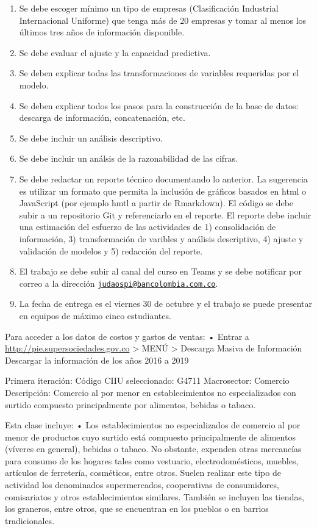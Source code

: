 \documentclass[
  11pt,
]{article}
\begin{document}
\begin{enumerate}
\def\labelenumi{\arabic{enumi}.}
\setcounter{enumi}{1}
\item
  Se debe escoger mínimo un tipo de empresas (Clasificación Industrial
  Internacional Uniforme) que tenga más de 20 empresas y tomar al menos
  los últimos tres años de información disponible.
\item
  Se debe evaluar el ajuste y la capacidad predictiva.
\item
  Se deben explicar todas las transformaciones de variables requeridas
  por el modelo.
\item
  Se deben explicar todos los pasos para la construcción de la base de
  datos: descarga de información, concatenación, etc.
\item
  Se debe incluir un análisis descriptivo.
\item
  Se debe incluir un análsis de la razonabilidad de las cifras.
\item
  Se debe redactar un reporte técnico documentando lo anterior. La
  sugerencia es utilizar un formato que permita la inclusión de gráficos
  basados en html o JavaScript (por ejemplo hmtl a partir de Rmarkdown).
  El código se debe subir a un repositorio Git y referenciarlo en el
  reporte. El reporte debe incluir una estimación del esfuerzo de las
  actividades de 1) consolidación de información, 3) transformación de
  varibles y análisis descriptivo, 4) ajuste y validación de modelos y
  5) redacción del reporte.
\item
  El trabajo se debe subir al canal del curso en Teams y se debe
  notificar por correo a la dirección
  \href{mailto:judaospi@bancolombia.com.co}{\nolinkurl{judaospi@bancolombia.com.co}}.
\item
  La fecha de entrega es el viernes 30 de octubre y el trabajo se puede
  presentar en equipos de máximo cinco estudiantes.
\end{enumerate}

Para acceder a los datos de costos y gastos de ventas: • Entrar a
\url{http://pie.supersociedades.gov.co} \textgreater{} MENÚ
\textgreater{} Descarga Masiva de Información Descargar la información
de los años 2016 a 2019

Primera iteración: Código CIIU seleccionado: G4711 Macrosector: Comercio
Descripción: Comercio al por menor en establecimientos no especializados
con surtido compuesto principalmente por alimentos, bebidas o tabaco.

Esta clase incluye: • Los establecimientos no especializados de comercio
al por menor de productos cuyo surtido está compuesto principalmente de
alimentos (víveres en general), bebidas o tabaco. No obstante, expenden
otras mercancías para consumo de los hogares tales como vestuario,
electrodomésticos, muebles, artículos de ferretería, cosméticos, entre
otros. Suelen realizar este tipo de actividad los denominados
supermercados, cooperativas de consumidores, comisariatos y otros
establecimientos similares. También se incluyen las tiendas, los
graneros, entre otros, que se encuentran en los pueblos o en barrios
tradicionales.
\end{document}
